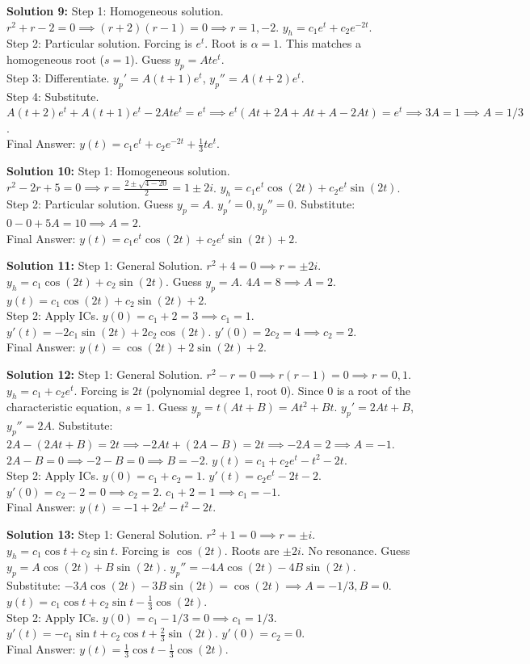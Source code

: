 \documentclass[11pt]{article}
\begin{document}
\textbf{Solution 9:}
Step 1: Homogeneous solution. $r^2 + r - 2 = 0 \implies (r+2)(r-1) = 0 \implies r = 1, -2$. $y_h = c_1e^t + c_2e^{-2t}$. \\
Step 2: Particular solution. Forcing is $e^t$. Root is $\alpha = 1$. This matches a homogeneous root ($s=1$). Guess $y_p = Ate^t$. \\
Step 3: Differentiate. $y_p' = A(t+1)e^t$, $y_p'' = A(t+2)e^t$. \\
Step 4: Substitute. $A(t+2)e^t + A(t+1)e^t - 2Ate^t = e^t \implies e^t(At + 2A + At + A - 2At) = e^t \implies 3A = 1 \implies A = 1/3$. \\
Final Answer: $y(t) = c_1e^t + c_2e^{-2t} + \frac{1}{3}te^t$.

\textbf{Solution 10:}
Step 1: Homogeneous solution. $r^2 - 2r + 5 = 0 \implies r = \frac{2 \pm \sqrt{4 - 20}}{2} = 1 \pm 2i$. $y_h = c_1e^t\cos(2t) + c_2e^t\sin(2t)$. \\
Step 2: Particular solution. Guess $y_p = A$. $y_p' = 0, y_p'' = 0$. Substitute: $0 - 0 + 5A = 10 \implies A = 2$. \\
Final Answer: $y(t) = c_1e^t\cos(2t) + c_2e^t\sin(2t) + 2$.

\textbf{Solution 11:}
Step 1: General Solution. $r^2 + 4 = 0 \implies r = \pm 2i$. $y_h = c_1\cos(2t) + c_2\sin(2t)$. Guess $y_p = A$. $4A = 8 \implies A = 2$. $y(t) = c_1\cos(2t) + c_2\sin(2t) + 2$. \\
Step 2: Apply ICs. $y(0) = c_1 + 2 = 3 \implies c_1 = 1$. $y'(t) = -2c_1\sin(2t) + 2c_2\cos(2t)$. $y'(0) = 2c_2 = 4 \implies c_2 = 2$. \\
Final Answer: $y(t) = \cos(2t) + 2\sin(2t) + 2$.

\textbf{Solution 12:}
Step 1: General Solution. $r^2 - r = 0 \implies r(r-1) = 0 \implies r = 0, 1$. $y_h = c_1 + c_2e^t$. Forcing is $2t$ (polynomial degree 1, root 0). Since 0 is a root of the characteristic equation, $s=1$. Guess $y_p = t(At + B) = At^2 + Bt$. $y_p' = 2At + B$, $y_p'' = 2A$. Substitute: $2A - (2At + B) = 2t \implies -2At + (2A - B) = 2t \implies -2A = 2 \implies A = -1$. $2A - B = 0 \implies -2 - B = 0 \implies B = -2$. $y(t) = c_1 + c_2e^t - t^2 - 2t$. \\
Step 2: Apply ICs. $y(0) = c_1 + c_2 = 1$. $y'(t) = c_2e^t - 2t - 2$. $y'(0) = c_2 - 2 = 0 \implies c_2 = 2$. $c_1 + 2 = 1 \implies c_1 = -1$. \\
Final Answer: $y(t) = -1 + 2e^t - t^2 - 2t$.

\textbf{Solution 13:}
Step 1: General Solution. $r^2 + 1 = 0 \implies r = \pm i$. $y_h = c_1\cos t + c_2\sin t$. Forcing is $\cos(2t)$. Roots are $\pm 2i$. No resonance. Guess $y_p = A\cos(2t) + B\sin(2t)$. $y_p'' = -4A\cos(2t) - 4B\sin(2t)$. Substitute: $-3A\cos(2t) - 3B\sin(2t) = \cos(2t) \implies A = -1/3, B = 0$. $y(t) = c_1\cos t + c_2\sin t - \frac{1}{3}\cos(2t)$. \\
Step 2: Apply ICs. $y(0) = c_1 - 1/3 = 0 \implies c_1 = 1/3$. $y'(t) = -c_1\sin t + c_2\cos t + \frac{2}{3}\sin(2t)$. $y'(0) = c_2 = 0$. \\
Final Answer: $y(t) = \frac{1}{3}\cos t - \frac{1}{3}\cos(2t)$.
\end{document}
